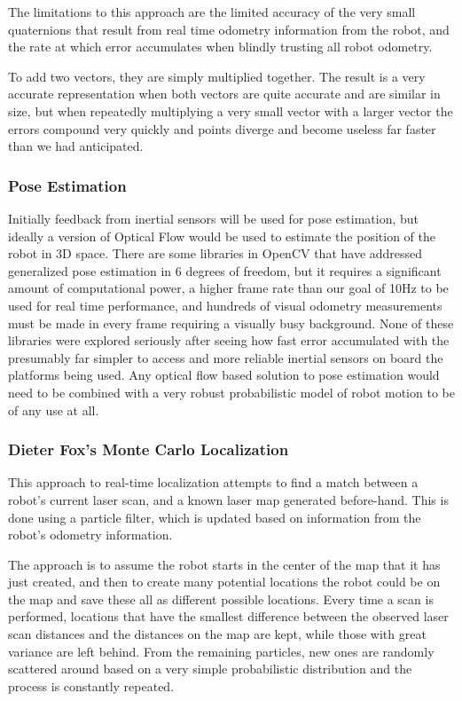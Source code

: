 \documentclass{article}[12]
\begin{document}
		The limitations to this approach are the limited accuracy of the very small quaternions that result from real time odometry information from the robot, and the rate at which error accumulates when blindly trusting all robot odometry. 
		
		To add two vectors, they are simply multiplied together. The result is a very accurate representation when both vectors are quite accurate and are similar in size, but when repeatedly multiplying a very small vector with a larger vector the errors compound very quickly and points diverge and become useless far faster than we had anticipated.
	
		\subsubsection{Pose Estimation}
	
		Initially feedback from inertial sensors will be used for pose estimation, but ideally a version of Optical Flow would be used to estimate the position of the robot in 3D space. There are some libraries in OpenCV that have addressed generalized pose estimation in 6 degrees of freedom, but it requires a significant amount of computational power, a higher frame rate than our goal of 10Hz to be used for real time performance, and hundreds of visual odometry measurements must be made in every frame requiring a visually busy background. None of these libraries were explored seriously after seeing how fast error accumulated with the presumably far simpler to access and more reliable inertial sensors on board the platforms being used. Any optical flow based solution to pose estimation would need to be combined with a very robust probabilistic model of robot motion to be of any use at all.
		
		\subsubsection{Dieter Fox's Monte Carlo Localization}
		
		This approach to real-time localization attempts to find a match between a robot's current laser scan, and a known laser map generated before-hand. This is done using a particle filter, which is updated based on information from the robot's odometry information. 
		
		The approach is to assume the robot starts in the center of the map that it has just created, and then to create many potential locations the robot could be on the map and save these all as different possible locations. Every time a scan is performed, locations that have the smallest difference between the observed laser scan distances and the distances on the map are kept, while those with great variance are left behind. From the remaining particles, new ones are randomly scattered around based on a very simple probabilistic distribution and the process is constantly repeated. 
		
\end{document}
